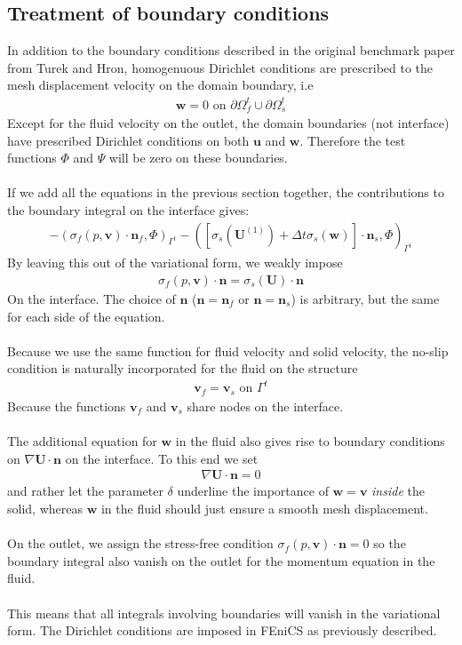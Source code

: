 \subsection{Treatment of boundary conditions}
In addition to the boundary conditions described in the original benchmark paper from Turek and Hron, homogenuous Dirichlet conditions are prescribed to the mesh displacement velocity on the domain boundary, i.e 
\begin{align} 
\mathbf{w} = 0 \text{ on } \partial \Omega_f^t \cup \partial \Omega_s^t
\end{align}
Except for the fluid velocity on the outlet, the domain boundaries (not interface) have prescribed Dirichlet conditions on both $\mathbf{u}$ and $\mathbf{w}$. Therefore the test functions $\Phi$ and $\Psi$ will be zero on these boundaries. \\ \\
If we add all the equations in the previous section together, the contributions to the boundary integral on the interface gives:
\begin{align}- (\sigma_f(p,\mathbf{v}) \cdot \mathbf{n}_f, \Phi)_{\Gamma^t} - ([\sigma_s(\mathbf{U}^{(1)}) + \Delta t \sigma_s(\mathbf{w})]\cdot \mathbf{n}_s, \Phi)_{\Gamma^t}
\end{align}
By leaving this out of the variational form, we weakly impose
\begin{align} \sigma_f(p,\mathbf{v}) \cdot \mathbf{n} = \sigma_s(\mathbf{U}) \cdot \mathbf{n}
\end{align}
On the interface. The choice of $\mathbf{n}$ ($\mathbf{n} = \mathbf{n}_f$ or $\mathbf{n} = \mathbf{n}_s$) is arbitrary, but the same for each side of the equation. \\
\\
Because we use the same function for fluid velocity and solid velocity, the no-slip condition is naturally incorporated for the fluid on the structure
\begin{align}
\mathbf{v}_f = \mathbf{v}_s \text{ on } \Gamma^t
\end{align}
Because the functions $\mathbf{v}_f$ and $\mathbf{v}_s$ share nodes on the interface.
\\
\\
The additional equation for $\mathbf{w}$ in the fluid also gives rise to boundary conditions on $\nabla \mathbf{U}\cdot\mathbf{n}$ on the interface. To this end we set 
\begin{align}
\nabla \mathbf{U} \cdot \mathbf{n} = 0
\end{align}
and rather let the parameter $\delta$ underline the importance of $\mathbf{w} = \mathbf{v}$ \textit{inside} the solid, whereas $\mathbf{w}$ in the fluid should just ensure a smooth mesh displacement. \\
\\
On the outlet, we assign the stress-free condition $\sigma_f(p,\mathbf{v}) \cdot \mathbf{n} = 0$ so the boundary integral also vanish on the outlet for the momentum equation in the fluid. 
\\
\\
This means that all integrals involving boundaries will vanish in the variational form. The Dirichlet conditions are imposed in FEniCS as previously described.


